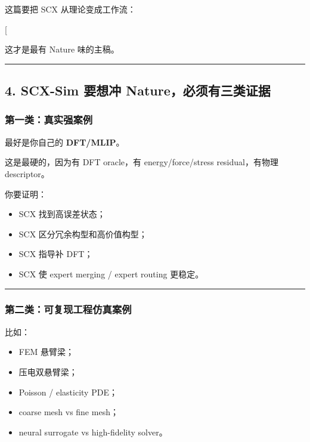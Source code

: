 \documentclass[
  12pt,
]{ctexart}
\providecommand{\tightlist}{%
  \setlength{\itemsep}{0pt}\setlength{\parskip}{0pt}}
\begin{document}
这篇要把 SCX 从理论变成工作流：

{[}  \rightarrow {}
\rightarrow {} \rightarrow {}
\rightarrow \text{cost saving}{]}

这才是最有 Nature 味的主稿。

\begin{center}\rule{0.5\linewidth}{0.5pt}\end{center}

\subsection{4. SCX-Sim 要想冲
Nature，必须有三类证据}\label{scx-sim-ux8981ux60f3ux51b2-natureux5fc5ux987bux6709ux4e09ux7c7bux8bc1ux636e}

\subsubsection{第一类：真实强案例}\label{ux7b2cux4e00ux7c7bux771fux5b9eux5f3aux6848ux4f8b}

最好是你自己的 \textbf{DFT/MLIP}。

这是最硬的，因为有 DFT oracle，有 energy/force/stress residual，有物理
descriptor。

你要证明：

\begin{itemize}
\tightlist
\item
  SCX 找到高误差状态；
\item
  SCX 区分冗余构型和高价值构型；
\item
  SCX 指导补 DFT；
\item
  SCX 使 expert merging / expert routing 更稳定。
\end{itemize}

\begin{center}\rule{0.5\linewidth}{0.5pt}\end{center}

\subsubsection{第二类：可复现工程仿真案例}\label{ux7b2cux4e8cux7c7bux53efux590dux73b0ux5de5ux7a0bux4effux771fux6848ux4f8b}

比如：

\begin{itemize}
\tightlist
\item
  FEM 悬臂梁；
\item
  压电双悬臂梁；
\item
  Poisson / elasticity PDE；
\item
  coarse mesh vs fine mesh；
\item
  neural surrogate vs high-fidelity solver。
\end{itemize}
\end{document}
